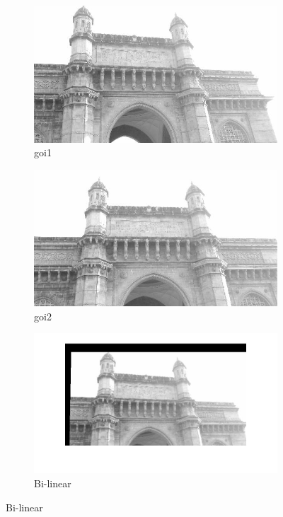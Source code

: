 \documentclass[a4paper]{article}
\begin{document}
\begin{figure}[H]
\begin{subfigure}{.4\textwidth}
  \centering
  \includegraphics[width=.8\linewidth]{goi1.jpg}  
  \caption{goi1}
  
\end{subfigure}
\begin{subfigure}{.4\textwidth}
  \centering
  \includegraphics[width=.8\linewidth]{goi2_downsampled.jpg}  
  \caption{goi2}
  
\end{subfigure}



\begin{subfigure}{.4\textwidth}
  \centering
  \includegraphics[width=.8\linewidth]{bilinear.jpg}  
  \caption{Bi-linear}
  

\end{subfigure}
\end{figure}
\end{document}
